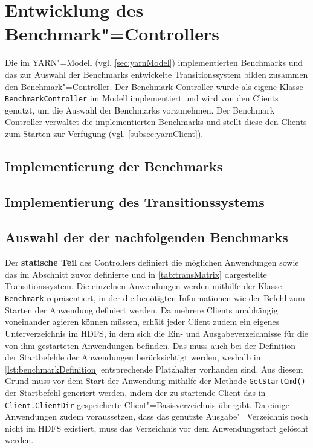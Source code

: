 \section{Entwicklung des Benchmark"=Controllers}
\label{sec:benchmarkController}

Die im \ac{YARN}"=Modell (vgl. \cref{sec:yarnModel}) implementierten Benchmarks und das zur Auswahl der Benchmarks entwickelte Transitionssystem bilden zusammen den Benchmark"=Controller.
Der Benchmark Controller wurde als eigene Klasse \texttt{BenchmarkController} im Modell implementiert und wird von den Clients genutzt, um die Auswahl der Benchmarks vorzunehmen.
Der Benchmark Controller verwaltet die implementierten Benchmarks und stellt diese den Clients zum Starten zur Verfügung (vgl. \cref{subsec:yarnClient}).

\subsection{Implementierung der Benchmarks}
\label{subsec:appImplementation}

\subsection{Implementierung des Transitionssystems}
\label{subsec:transitionImpl}

\subsection{Auswahl der der nachfolgenden Benchmarks}
\label{subsec:selectionNextBenchmark}

Der \textbf{statische Teil} des Controllers definiert die möglichen Anwendungen sowie das im Abschnitt zuvor definierte und in \cref{tab:transMatrix} dargestellte Transitionssystem.
Die einzelnen Anwendungen werden mithilfe der Klasse \texttt{Benchmark} repräsentiert, in der die benötigten Informationen wie \zB der Befehl zum Starten der Anwendung definiert werden.
Da mehrere Clients unabhängig voneinander agieren können müssen, erhält jeder Client zudem ein eigenes Unterverzeichnis im \ac{HDFS}, in dem sich die Ein- und Ausgabeverzeichnisse für die von ihm gestarteten Anwendungen befinden.
Das muss auch bei der Definition der Startbefehle der Anwendungen berücksichtigt werden, weshalb in \cref{lst:benchmarkDefinition} entsprechende Platzhalter vorhanden sind.
Aus diesem Grund muss vor dem Start der Anwendung mithilfe der Methode \texttt{GetStartCmd()} der Startbefehl generiert werden, indem der zu startende Client das in \texttt{Client.ClientDir} gespeicherte Client"=Basisverzeichnis übergibt.
Da einige Anwendungen zudem voraussetzen, dass das genutzte Ausgabe"=Verzeichnis noch nicht im \ac{HDFS} existiert, muss das Verzeichnis vor dem Anwendungsstart gelöscht werden.

